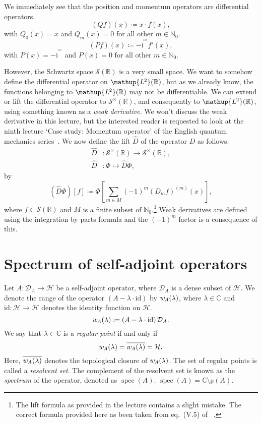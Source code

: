 \documentclass[12pt, a4 paper]{article}
\theoremstyle{definition}
\newcommand{\ltwo}{\mathup{L\kern-0.5pt^2}}
\newcommand{\position}{Q}
\newcommand{\momentum}{P}
\newcommand{\rr}{\mathbb{R}}
\newcommand{\cc}{\mathbb{C}}
\newcommand{\nn}{\mathbb{N}_0}
\newcommand{\hilbert}{\mathcal{H}}
\newcommand{\ltwor}{\ltwo(\rr)}
\newcommand{\schwartz}{\mathcal{S}}
\newcommand{\schwartzr}{\schwartz(\rr)}
\newcommand{\dist}{\schwartz^\times}
\newcommand{\distr}{\dist(\rr)}
\renewcommand*{\hbar}{\mathrm{^^^^0127}}
\renewcommand{\i}{\mathrm{i}}
\newcommand{\lift}{\hat{D}}
\newcommand{\domain}{\mathcal{D}}
\newcommand{\identity}{\mathrm{id}}
\newcommand{\w}{w\kern-1pt}
\DeclareMathOperator{\spec}{spec}
\newcommand{\resolvent}{\mathup{\rho}}
\begin{document}
	We immediately see that the position and momentum operators are differential operators.
	\[
	(\position f)(x) \coloneq x \cdot f(x),
	\]
	with $\position_0(x) = x$ and $\position_m(x) = 0$ for all other $m \in \nn$.
	\[
	(\momentum f)(x) \coloneq -\i\hbar f'(x),
	\]
	with $\momentum(x) = -\i\hbar$ and $\momentum(x) = 0$ for all other $m \in \nn$.

	However, the Schwartz space $\schwartzr$ is a very small space. We want to somehow define the differential operator on $\ltwor$, but as we already know, the functions belonging to $\ltwor$ may not be differentiable. We can extend or lift the differential operator to $\distr$, and consequently to $\ltwor$, using something known as a \textit{weak derivative}. We won't discuss the weak derivative in this lecture, but the interested reader is requested to look at the ninth lecture `Case study: Momentum operator' of the English quantum mechanics series~\cite{Schuller, SchullerVideos}. We now define the lift $\lift$ of the operator $D$ as follows.
	\begin{align*}
		\lift &\colon \distr \rightarrow \distr,\\
		\lift &\colon \Phi \mapsto \lift\Phi,
	\end{align*}
	by
	\[
	(\lift\Phi)[f] \coloneq \Phi\left[\sum_{m\in M} (-1)^m (D_m f)^{(m)} (x)\right],
	\]
	where $f \in \schwartzr$ and $M$ is a finite subset of $\nn$.\footnote{The lift formula as provided in the lecture contains a slight mistake. The correct formula provided here as been taken from eq.~(V.5) of ~\cite[p.~149]{Reed}.} Weak derivatives are defined using the integration by parts formula and the $(-1)^m$ factor is a consequence of this.

	\section{Spectrum of self-adjoint operators}

	Let $A \colon \domain_A \rightarrow \hilbert$ be a self-adjoint operator, where $\domain_A$ is a dense subset of $\hilbert$. We denote the range of the operator $(A - \lambda \cdot \identity)$ by $\w_A(\lambda)$, where $\lambda \in \cc$ and $\identity \colon \hilbert \rightarrow \hilbert$ denotes the identity function on $\hilbert$.
	\[
	\w_A(\lambda) \coloneq (A - \lambda \cdot \identity)\,\domain_A.
	\]
	We say that $\lambda \in \cc$ is a \textit{regular point} if and only if
	\[
	\w_A(\lambda) = \overline{\w_A(\lambda)} = \hilbert.
	\]
	Here, $\overline{\w_A(\lambda)}$ denotes the topological closure of $\w_A(\lambda)$. The set of regular points is called a \textit{resolvent set}. The complement of the resolvent set is known as the \textit{spectrum} of the operator, denoted as $\spec(A)$. $\spec(A) = \cc \setminus \resolvent(A)$.
\end{document}

